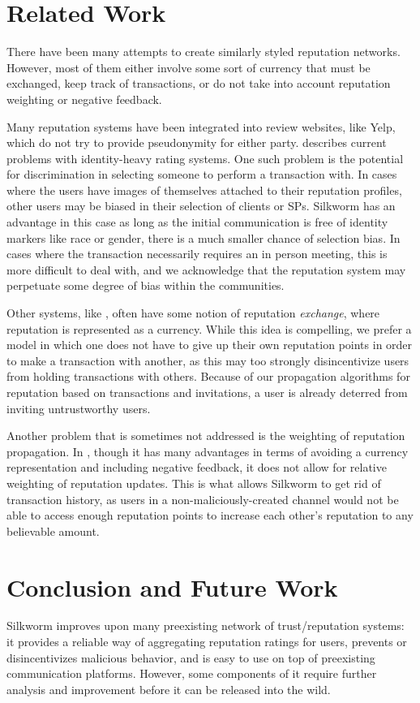 \documentclass[letterpaper,twocolumn,10pt]{article}
\begin{document}
\section{Related Work}
There have been many attempts to create similarly styled reputation networks. However, most of them either involve some sort of currency that must be exchanged, keep track of transactions, or do not take into account reputation weighting or negative feedback. 

Many reputation systems have been integrated into review websites, like Yelp, which do not try to provide pseudonymity for either party. \cite{HBSPaper} describes current problems with identity-heavy rating systems. One such problem is the potential for discrimination in selecting someone to perform a transaction with. In cases where the users have images of themselves attached to their reputation profiles, other users may be biased in their selection of clients or SPs. Silkworm has an advantage in this case as long as the initial communication is free of identity markers like race or gender, there is a much smaller chance of selection bias. In cases where the transaction necessarily requires an in person meeting, this is more difficult to deal with, and we acknowledge that the reputation system may perpetuate some degree of bias within the communities. 

Other systems, like \cite{RepCoin}, often have some notion of reputation \textit{exchange}, where reputation is represented as a currency. While this idea is compelling, we prefer a model in which one does not have to give up their own reputation points in order to make a transaction with another, as this may too strongly disincentivize users from holding transactions with others. Because of our propagation algorithms for reputation based on transactions and invitations, a user is already deterred from inviting untrustworthy users. 

Another problem that is sometimes not addressed is the weighting of reputation propagation. In \cite{AnonRep}, though it has many advantages in terms of avoiding a currency representation and including negative feedback, it does not allow for relative weighting of reputation updates. This is what allows Silkworm to get rid of transaction history, as users in a non-maliciously-created channel would not be able to access enough reputation points to increase each other's reputation to any believable amount. 

\section{Conclusion and Future Work}
Silkworm improves upon many preexisting network of trust/reputation systems: it provides a reliable way of aggregating reputation ratings for users, prevents or disincentivizes malicious behavior, and is easy to use on top of preexisting communication platforms. However, some components of it require further analysis and improvement before it can be released into the wild.
\end{document}
